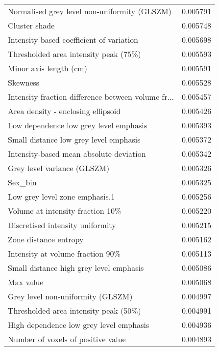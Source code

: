 \begin{longtable}{|lr|}
Normalised grey level non-uniformity (GLSZM)       &        0.005791 \\
Cluster shade                                      &        0.005748 \\
Intensity-based coefficient of variation           &        0.005698 \\
Thresholded area intensity peak (75\%)              &        0.005593 \\
Minor axis length (cm)                             &        0.005591 \\
Skewness                                           &        0.005528 \\
Intensity fraction difference between volume fr... &        0.005457 \\
Area density - enclosing ellipsoid                 &        0.005426 \\
Low dependence low grey level emphasis             &        0.005393 \\
Small distance low grey level emphasis             &        0.005372 \\
Intensity-based mean absolute deviation            &        0.005342 \\
Grey level variance (GLSZM)                        &        0.005326 \\
Sex\_bin                                            &        0.005325 \\
Low grey level zone emphasis.1                     &        0.005256 \\
Volume at intensity fraction 10\%                   &        0.005220 \\
Discretised intensity uniformity                   &        0.005215 \\
Zone distance entropy                              &        0.005162 \\
Intensity at volume fraction 90\%                   &        0.005113 \\
Small distance high grey level emphasis            &        0.005086 \\
Max value                                          &        0.005068 \\
Grey level non-uniformity (GLSZM)                  &        0.004997 \\
Thresholded area intensity peak (50\%)              &        0.004991 \\
High dependence low grey level emphasis            &        0.004936 \\
Number of voxels of positive value                 &        0.004893 \\

\end{longtable}
